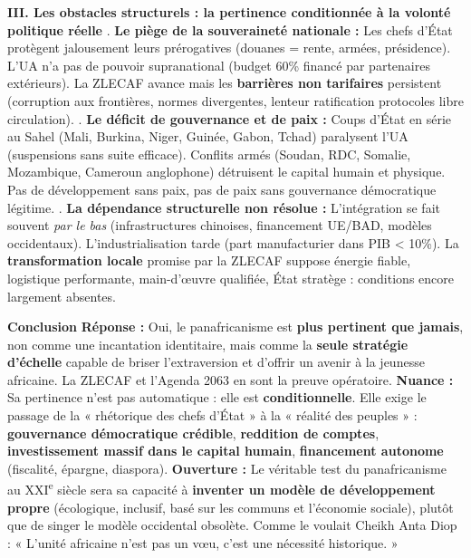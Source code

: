 \documentclass[11pt]{article}
\begin{document}
\begin{corrige}
\vspace{0,2cm}
\noindent\textbf{III. Les obstacles structurels : la pertinence conditionnée à la volonté politique réelle}
\vspace{0,1cm}
. \textbf{Le piège de la souveraineté nationale :} Les chefs d'État protègent jalousement leurs prérogatives (douanes = rente, armées, présidence). L'UA n'a pas de pouvoir supranational (budget 60\% financé par partenaires extérieurs). La ZLECAF avance mais les \textbf{barrières non tarifaires} persistent (corruption aux frontières, normes divergentes, lenteur ratification protocoles libre circulation).
\vspace{0,1cm}
. \textbf{Le déficit de gouvernance et de paix :} Coups d'État en série au Sahel (Mali, Burkina, Niger, Guinée, Gabon, Tchad) paralysent l'UA (suspensions sans suite efficace). Conflits armés (Soudan, RDC, Somalie, Mozambique, Cameroun anglophone) détruisent le capital humain et physique. Pas de développement sans paix, pas de paix sans gouvernance démocratique légitime.
\vspace{0,1cm}
. \textbf{La dépendance structurelle non résolue :} L'intégration se fait souvent \emph{par le bas} (infrastructures chinoises, financement UE/BAD, modèles occidentaux). L'industrialisation tarde (part manufacturier dans PIB < 10\%). La \textbf{transformation locale} promise par la ZLECAF suppose énergie fiable, logistique performante, main-d'œuvre qualifiée, État stratège : conditions encore largement absentes.

\vspace{0,5cm}
\noindent\textbf{Conclusion}
\vspace{0,2cm}
\noindent\textbf{Réponse :} Oui, le panafricanisme est \textbf{plus pertinent que jamais}, non comme une incantation identitaire, mais comme la \textbf{seule stratégie d'échelle} capable de briser l'extraversion et d'offrir un avenir à la jeunesse africaine. La ZLECAF et l'Agenda 2063 en sont la preuve opératoire.
\vspace{0,1cm}
\noindent\textbf{Nuance :} Sa pertinence n'est pas automatique : elle est \textbf{conditionnelle}. Elle exige le passage de la « rhétorique des chefs d'État » à la « réalité des peuples » : \textbf{gouvernance démocratique crédible}, \textbf{reddition de comptes}, \textbf{investissement massif dans le capital humain}, \textbf{financement autonome} (fiscalité, épargne, diaspora).
\vspace{0,1cm}
\noindent\textbf{Ouverture :} Le véritable test du panafricanisme au XXI\textsuperscript{e} siècle sera sa capacité à \textbf{inventer un modèle de développement propre} (écologique, inclusif, basé sur les communs et l'économie sociale), plutôt que de singer le modèle occidental obsolète. Comme le voulait Cheikh Anta Diop : « L'unité africaine n'est pas un vœu, c'est une nécessité historique. »
\end{corrige}
\end{document}
